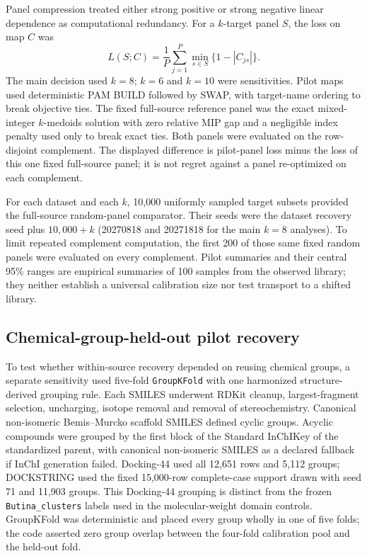 Panel compression treated either strong positive or strong negative linear
dependence as computational redundancy.  For a $k$-target panel $S$, the loss
on map $C$ was
\[
 L(S;C)=\frac{1}{P}\sum_{j=1}^{P}\min_{s\in S}\{1-|C_{js}|\}.
\]
The main decision used $k=8$; $k=6$ and $k=10$ were sensitivities.  Pilot maps
used deterministic PAM BUILD followed by SWAP, with target-name ordering to
break objective ties.  The fixed full-source reference panel was the exact
mixed-integer $k$-medoids solution with zero relative MIP gap and a negligible
index penalty used only to break exact ties.  Both panels were evaluated on the
row-disjoint complement.  The displayed difference is pilot-panel loss minus
the loss of this one fixed full-source panel; it is not regret against a panel
re-optimized on each complement.

For each dataset and each $k$, 10,000 uniformly sampled target subsets provided
the full-source random-panel comparator.  Their seeds were the dataset recovery
seed plus $10,000+k$ (20270818 and 20271818 for the main $k=8$ analyses).  To
limit repeated complement computation, the first 200 of those same fixed random
panels were evaluated on every complement.  Pilot summaries and their central
95\% ranges are empirical summaries of 100 samples from the observed library;
they neither establish a universal calibration size nor test transport to a
shifted library.

\subsection{Chemical-group-held-out pilot recovery}

To test whether within-source recovery depended on reusing chemical groups, a
separate sensitivity used five-fold \texttt{GroupKFold} with one harmonized
structure-derived grouping rule.  Each SMILES underwent RDKit cleanup,
largest-fragment selection, uncharging, isotope removal and removal of
stereochemistry.  Canonical non-isomeric Bemis--Murcko scaffold SMILES defined
cyclic groups.  Acyclic compounds were grouped by the first block of the
Standard InChIKey of the standardized parent, with canonical non-isomeric
SMILES as a declared fallback if InChI generation failed.  Docking-44 used all
12,651 rows and 5,112 groups; DOCKSTRING used the fixed 15,000-row complete-case
support drawn with seed 71 and 11,903 groups.  This Docking-44 grouping is
distinct from the frozen \texttt{Butina\_clusters} labels used in the
molecular-weight domain controls.  GroupKFold was deterministic and placed
every group wholly in one of five folds; the code asserted zero group overlap
between the four-fold calibration pool and the held-out fold.

